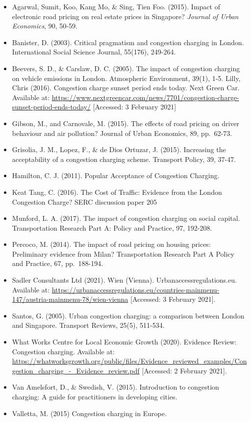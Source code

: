 \documentclass[
]{book}
\providecommand{\tightlist}{%
  \setlength{\itemsep}{0pt}\setlength{\parskip}{0pt}}
\begin{document}
\begin{itemize}
\tightlist
\item
  Agarwal, Sumit, Koo, Kang Mo, \& Sing, Tien Foo. (2015). Impact of electronic road pricing on real estate prices in Singapore? \emph{Journal of Urban Economics}, 90, 50-59.
\item
  Banister, D. (2003). Critical pragmatism and congestion charging in London. International Social Science Journal, 55(176), 249-264.
\item
  Beevers, S. D., \& Carslaw, D. C. (2005). The impact of congestion charging on vehicle emissions in London. Atmospheric Environment, 39(1), 1-5.
  Lilly, Chris (2016). Congestion charge sunset period ends today. Next Green Car. Available at:
  \url{https://www.nextgreencar.com/news/7701/congestion-charge-sunset-period-ends-today/} {[}Accessed: 3 February 2021{]}
\item
  Gibson, M., and Carnovale, M. (2015). The effects of road pricing on driver behaviour and air pollution? Journal of Urban Economics, 89, pp.~62-73.
\item
  Grisolia, J. M., Lopez, F., \& de Dios Ortuzar, J. (2015). Increasing the acceptability of a congestion charging scheme. Transport Policy, 39, 37-47.
\item
  Hamilton, C. J. (2011). Popular Acceptance of Congestion Charging.
\item
  Keat Tang, C. (2016). The Cost of Traffic: Evidence from the London Congestion Charge? SERC discussion paper 205
\item
  Munford, L. A. (2017). The impact of congestion charging on social capital. Transportation Research Part A: Policy and Practice, 97, 192-208.
\item
  Percoco, M. (2014). The impact of road pricing on housing prices: Preliminary evidence from Milan? Transportation Research Part A Policy and Practice, 67, pp.~188-194.
\item
  Sadler Consultants Ltd (2021). Wien (Vienna). Urbanaccessregulations.eu. Available at: \url{https://urbanaccessregulations.eu/countries-mainmenu-147/austria-mainmenu-78/wien-vienna} {[}Accessed: 3 February 2021{]}.
\item
  Santos, G. (2005). Urban congestion charging: a comparison between London and Singapore. Transport Reviews, 25(5), 511-534.
\item
  What Works Centre for Local Economic Growth (2020). Evidence Review: Congestion charging. Available at: \url{https://whatworksgrowth.org/public/files/Evidence_reviewed_examples/Congestion_charging_-_Evidence_review.pdf} {[}Accessed: 2 February 2021{]}.
\item
  Van Amelsfort, D., \& Swedish, V. (2015). Introduction to congestion charging: A guide for practitioners in developing cities.
\item
  Valletta, M. (2015) Congestion charging in Europe.
\end{itemize}
\end{document}

